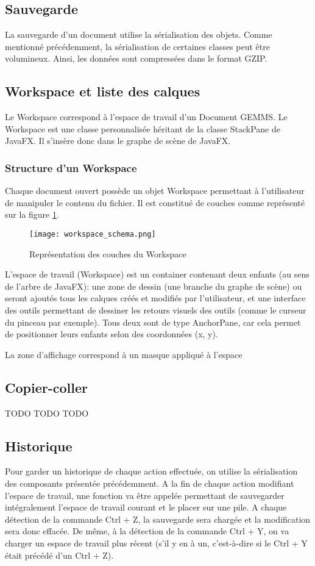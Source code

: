 \subsection{Sauvegarde}
La sauvegarde d'un document utilise la sérialisation des objets. Comme mentionné précédemment, la sérialisation de certaines classes peut être volumineux. Ainsi, les données sont compressées dans le format GZIP.

\subsection{Workspace et liste des calques}
Le Workspace correspond à l'espace de travail d'un Document GEMMS. Le Workspace est une classe personnalisée héritant de la classe StackPane de JavaFX. Il s'insère donc dans le graphe de scène de JavaFX. 
\subsubsection{Structure d'un Workspace}
Chaque document ouvert possède un objet Workspace permettant à l'utilisateur de manipuler le contenu du fichier. Il est constitué de couches comme représenté sur la figure \ref{fig:workspace_representation}.


\begin{figure}[H]
	\caption{Représentation des couches du Workspace}
	\centering
	\texttt{[image: workspace\_schema.png]}
	\label{fig:workspace_representation}
\end{figure}

L'espace de travail (Workspace) est un container contenant deux enfants (au sens de l'arbre de JavaFX): une zone de dessin (une branche du graphe de scène) ou seront ajoutés tous les calques créés et modifiés par l'utilisateur, et une interface des outils permettant de dessiner les retours visuels des outils (comme le curseur du pinceau par exemple). Tous deux sont de type AnchorPane, car cela permet de positionner leurs enfants selon des coordonnées (x, y).
\par
La zone d'affichage correspond à un masque appliqué à l'espace 


\subsection{Copier-coller}
TODO TODO TODO

\subsection{Historique}
Pour garder un historique de chaque action effectuée, on utilise la sérialisation des composants présentée précédemment. A la fin de chaque action modifiant l'espace de travail, une fonction va être appelée permettant de sauvegarder intégralement l'espace de travail courant et le placer sur une pile. A chaque détection de la commande Ctrl + Z, la sauvegarde sera chargée et la modification sera donc effacée. De même, à la détection de la commande Ctrl + Y, on va charger un espace de travail plus récent (s'il y en à un, c'est-à-dire si le Ctrl + Y était précédé d'un Ctrl + Z).

